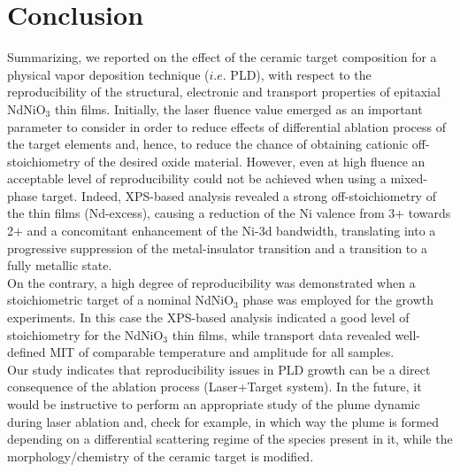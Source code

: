 \documentclass[aip,graphicx,numerical]{revtex4-1}
\begin{document}
\section{Conclusion}
Summarizing, we reported on the effect of the ceramic target composition for a physical vapor deposition technique ($i.e.$ PLD), with respect to the reproducibility of the structural, electronic and transport properties of epitaxial NdNiO$_3$ thin films. Initially, the laser fluence value emerged as an important parameter to consider in order to reduce effects of differential ablation process of the target elements and, hence, to reduce the chance of obtaining cationic off-stoichiometry of the desired oxide material. However, even at high fluence an acceptable level of reproducibility could not be achieved when using a mixed-phase target. Indeed, XPS-based analysis revealed a strong off-stoichiometry of the thin films (Nd-excess), causing a reduction of the Ni valence from 3+ towards 2+ and a concomitant enhancement of the Ni-3d bandwidth, translating into a progressive suppression of the metal-insulator transition and a transition to a fully metallic state. \\
 On the contrary, a high degree of reproducibility was demonstrated when a stoichiometric target of a nominal NdNiO$_3$ phase was employed for the growth experiments. In this case the XPS-based analysis indicated a good level of stoichiometry for the NdNiO$_3$ thin films, while transport data revealed well-defined MIT of comparable temperature and amplitude for all samples. \\
Our study indicates that reproducibility issues in PLD growth can be a direct consequence of the ablation process (Laser+Target system). In the future, it would be instructive to perform an appropriate study of the plume dynamic during laser ablation and, check for example, in which way the plume is formed depending on a differential scattering regime of the species present in it, while the morphology/chemistry of the ceramic target is modified.


%
%
\end{document}

